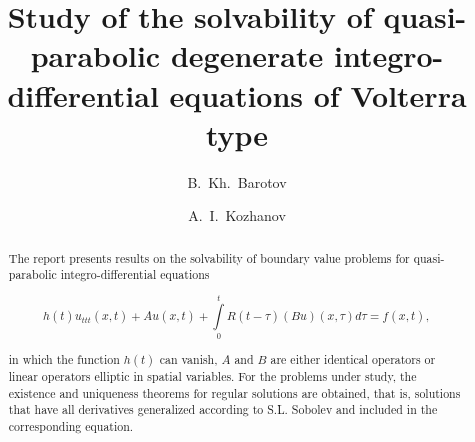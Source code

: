 \begin{englishtitle} %
\title{Study of the solvability of quasi-parabolic degenerate integro-differential equations of Volterra type}
\author{B.~Kh.~Barotov   \and  A.~I.~Kozhanov
}

\maketitle

\begin{abstract}
The report presents results on the solvability of boundary value problems for quasi-parabolic integro-differential equations

$$ h(t)u_{ttt}(x,t)+ Au(x,t) +\int\limits_0^t R(t-\tau) (Bu)(x,\tau)d\tau =f(x,t),  $$

in which the function $h(t)$ can vanish, $A$ and $B$ are either identical operators or linear operators elliptic in spatial variables.  For the problems under study, the existence and uniqueness theorems for regular solutions are obtained, that is, solutions that have all derivatives generalized according to S.L. Sobolev and included in the corresponding equation.

\end{abstract}
\end{englishtitle}


\iffalse
%
%


\documentclass[12pt]{llncs}  


\usepackage{iftex}

\ifPDFTeX
\usepackage[T2A]{fontenc}
\usepackage[utf8]{inputenc} %
\usepackage[english,russian]{babel}
\fi

